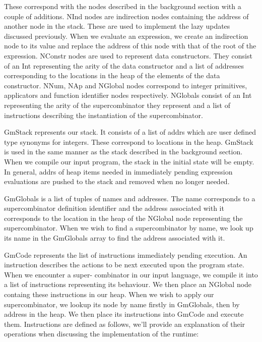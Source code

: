 These correspond with the nodes described in the background section
with a couple of additions. NInd nodes are indirection nodes 
containing the address of another node in the stack. These are
used to implement the lazy updates discussed previously. When we
evaluate an expression, we create an indirection node to its
value and replace the address of this node with that of the root
of the expression. NConstr nodes are used to represent data
constructors. They consist of an Int representing the arity
of the data constructor and a list of addresses corresponding to
the locations in the heap of the elements of the data constructor.
NNum, NAp and NGlobal nodes correspond to integer primitives, 
applicators and function identifier nodes respectively. NGlobals
consist of an Int representing the arity of the supercombinator
they represent and a list of instructions describing the 
instantiation of the supercombinator.

GmStack represents our stack. It consists of a list of addrs 
which are user defined type synonyms for integers. These 
correspond to locations in the heap. GmStack is used in the same
manner as the stack described in the background section. When we
compile our input program, the stack in the initial state will
be empty. In general, addrs
of heap items needed in immediately pending expression evaluations
are pushed to the stack and removed when no longer needed.

GmGlobals is a list of tuples of names and addresses. The name
corresponds to a supercombinator definition identifier and the
address associated with it corresponds to the location in the
heap of the NGlobal node representing the supercombinator. When
we wish to find a supercombinator by name, we look up its name
in the GmGlobals array to find the address associated with it.

GmCode represents the list of instructions immediately pending
execution. An instruction describes the actions to be next
executed upon the program state. When we encounter a super-
combinator in our input language, we compile it into a list
of instructions representing its behaviour. We then place an
NGlobal node containg these instructions in our heap. When
we wish to apply our supercombinator, we lookup its node by
name firstly in GmGlobals, then by address in the heap. We
then place its instructions into GmCode and execute them.
Instructions are defined as follows, we'll provide an 
explanation of their operations when discussing the implementation
of the runtime:

